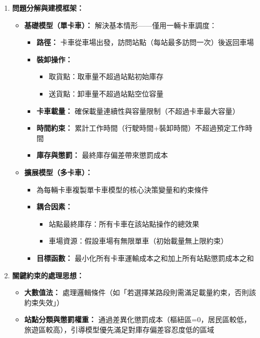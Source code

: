 \begin{enumerate}
    \item \textbf{問題分解與建模框架：}
    \begin{itemize}
        \item \textbf{基礎模型（單卡車）：} 解決基本情形——僅用一輛卡車調度：
        \begin{itemize}
            \item \textbf{路徑：} 卡車從車場出發，訪問站點（每站最多訪問一次）後返回車場
            \item \textbf{裝卸操作：}
            \begin{itemize}
                \item 取貨點：取車量不超過站點初始庫存
                \item 送貨點：卸車量不超過站點空位容量
            \end{itemize}
            \item \textbf{卡車載量：} 確保載量連續性與容量限制（不超過卡車最大容量）
            \item \textbf{時間約束：} 累計工作時間（行駛時間+裝卸時間）不超過預定工作時間
            \item \textbf{庫存與懲罰：} 最終庫存偏差帶來懲罰成本
        \end{itemize}
        \item \textbf{擴展模型（多卡車）：}
        \begin{itemize}
            \item 為每輛卡車複製單卡車模型的核心決策變量和約束條件
            \item \textbf{耦合因素：}
            \begin{itemize}
                \item 站點最終庫存：所有卡車在該站點操作的總效果
                \item 車場資源：假設車場有無限單車（初始載量無上限約束）
            \end{itemize}
            \item \textbf{目標函數：} 最小化所有卡車運輸成本之和加上所有站點懲罰成本之和
        \end{itemize}
    \end{itemize}

    \item \textbf{關鍵約束的處理思想：}
    \begin{itemize}
        \item \textbf{大數值法：} 處理邏輯條件（如「若選擇某路段則需滿足載量約束，否則該約束失效」）
        \item \textbf{站點分類與懲罰權重：} 通過差異化懲罰成本（樞紐區=0，居民區較低，旅遊區較高），引導模型優先滿足對庫存偏差容忍度低的區域
    \end{itemize}


\end{enumerate}
